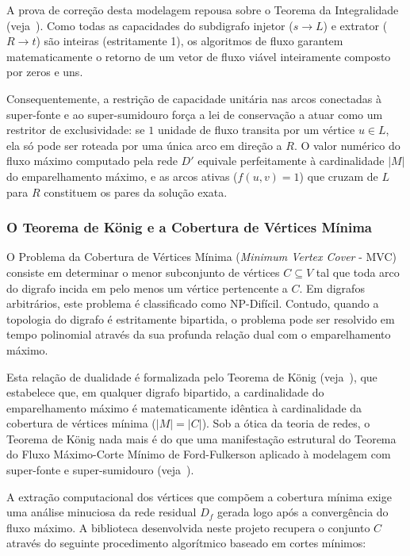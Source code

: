 \documentclass[12pt,a4paper]{article}
\begin{document}
A prova de correção desta modelagem repousa sobre o Teorema da Integralidade (veja~\cite{korte2018combinatorial}). Como todas as capacidades do subdigrafo injetor ($s \rightarrow L$) e extrator ($R \rightarrow t$) são inteiras (estritamente 1), os algoritmos de fluxo garantem matematicamente o retorno de um vetor de fluxo viável inteiramente composto por zeros e uns.

Consequentemente, a restrição de capacidade unitária nas arcos conectadas à super-fonte e ao super-sumidouro força a lei de conservação a atuar como um restritor de exclusividade: se $1$ unidade de fluxo transita por um vértice $u \in L$, ela só pode ser roteada por uma única arco em direção a $R$. O valor numérico do fluxo máximo computado pela rede $D'$ equivale perfeitamente à cardinalidade $|M|$ do emparelhamento máximo, e as arcos ativas ($f(u,v) = 1$) que cruzam de $L$ para $R$ constituem os pares da solução exata.

\subsubsection{O Teorema de König e a Cobertura de Vértices Mínima}

O Problema da Cobertura de Vértices Mínima (\textit{Minimum Vertex Cover} - MVC) consiste em determinar o menor subconjunto de vértices $C \subseteq V$ tal que toda arco do digrafo incida em pelo menos um vértice pertencente a $C$. Em digrafos arbitrários, este problema é classificado como NP-Difícil. Contudo, quando a topologia do digrafo é estritamente bipartida, o problema pode ser resolvido em tempo polinomial através da sua profunda relação dual com o emparelhamento máximo.

Esta relação de dualidade é formalizada pelo Teorema de König (veja~\cite{korte2018combinatorial}), que estabelece que, em qualquer digrafo bipartido, a cardinalidade do emparelhamento máximo é matematicamente idêntica à cardinalidade da cobertura de vértices mínima ($|M| = |C|$). Sob a ótica da teoria de redes, o Teorema de König nada mais é do que uma manifestação estrutural do Teorema do Fluxo Máximo-Corte Mínimo de Ford-Fulkerson aplicado à modelagem com super-fonte e super-sumidouro (veja~\cite{ahuja1993network}).

A extração computacional dos vértices que compõem a cobertura mínima exige uma análise minuciosa da rede residual $D_f$ gerada logo após a convergência do fluxo máximo. A biblioteca desenvolvida neste projeto recupera o conjunto $C$ através do seguinte procedimento algorítmico baseado em cortes mínimos:
\end{document}
